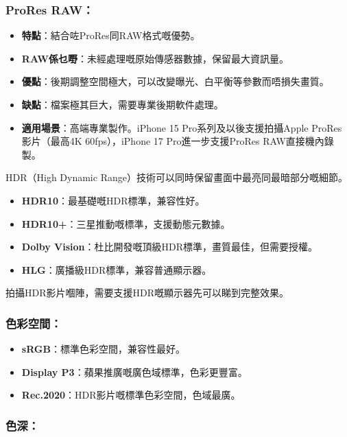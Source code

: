 \subsubsection*{ProRes RAW：}

\begin{itemize}
  \item \textbf{特點}：結合咗ProRes同RAW格式嘅優勢。
  \item \textbf{RAW係乜嘢}：未經處理嘅原始傳感器數據，保留最大資訊量。
  \item \textbf{優點}：後期調整空間極大，可以改變曝光、白平衡等參數而唔損失畫質。
  \item \textbf{缺點}：檔案極其巨大，需要專業後期軟件處理。
  \item \textbf{適用場景}：高端專業製作。iPhone 15 Pro系列及以後支援拍攝Apple ProRes影片（最高4K 60fps），iPhone 17 Pro進一步支援ProRes RAW直接機內錄製。
\end{itemize}


HDR（High Dynamic Range）技術可以同時保留畫面中最亮同最暗部分嘅細節。

\begin{itemize}
  \item \textbf{HDR10}：最基礎嘅HDR標準，兼容性好。
  \item \textbf{HDR10+}：三星推動嘅標準，支援動態元數據。
  \item \textbf{Dolby Vision}：杜比開發嘅頂級HDR標準，畫質最佳，但需要授權。
  \item \textbf{HLG}：廣播級HDR標準，兼容普通顯示器。
\end{itemize}

拍攝HDR影片嗰陣，需要支援HDR嘅顯示器先可以睇到完整效果。


\subsubsection*{色彩空間：}

\begin{itemize}
  \item \textbf{sRGB}：標準色彩空間，兼容性最好。
  \item \textbf{Display P3}：蘋果推廣嘅廣色域標準，色彩更豐富。
  \item \textbf{Rec.2020}：HDR影片嘅標準色彩空間，色域最廣。
\end{itemize}

\subsubsection*{色深：}

